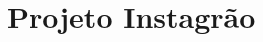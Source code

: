 \documentclass[13pt, xcolor={dvipsnames,svgnames}, portuguese]{beamer}
\begin{document}
\section{Projeto Instagrão}









\end{document}
